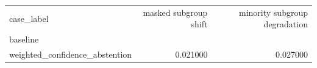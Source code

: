 \begin{tabular}{lrr}
\toprule
case_label & masked subgroup shift & minority subgroup degradation \\
baseline &  &  \\
\midrule
weighted_confidence_abstention & 0.021000 & 0.027000 \\
\bottomrule
\end{tabular}
